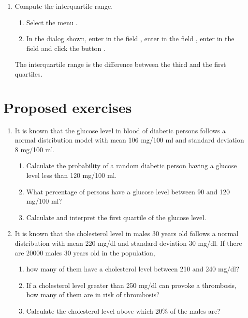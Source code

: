 \begin{enumerate}[leftmargin=*]
\begin{enumerate}
\item Compute the interquartile range.
\begin{indication}
\begin{enumerate}
\item Select the menu .
\item In the dialog shown, enter  in the field , enter  in the field , enter  in the field  and click the button .
\end{enumerate}
The interquartile range is the difference between the third and the first quartiles. 
\end{indication}
\end{enumerate}

\end{enumerate}


\section{Proposed exercises}
\begin{enumerate}[leftmargin=*]
\item It is known that the glucose level in blood of diabetic persons follows a normal distribution model with
mean 106 mg/100 ml and standard deviation 8 mg/100 ml.
\begin{enumerate}
\item Calculate the probability of a random diabetic person having a glucose level less than 120 mg/100 ml. 
\item What percentage of persons have a glucose level between 90 and 120 mg/100 ml?
\item Calculate and interpret the first quartile of the glucose level. 
\end{enumerate}

\item It is known that the cholesterol level in males 30 years old follows a normal distribution with mean 220 mg/dl and
standard deviation 30 mg/dl. 
If there are 20000 males 30 years old in the population,
\begin{enumerate}
\item how many of them have a cholesterol level between 210 and 240 mg/dl?
\item If a cholesterol level greater than 250 mg/dl can provoke a thrombosis, how many of them are in risk of
thrombosis?
\item Calculate the cholesterol level above which 20\% of the males are?
\end{enumerate}
\end{enumerate}
